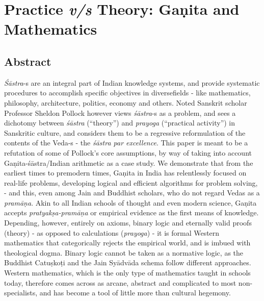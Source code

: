 \chapter[Practice {\sl  v/s} Theory: Gaṇita and Mathematics]{Practice {\sl\bfseries v/s} Theory: Gaṇita and Mathematics}\label{chapter2\thechapter:begin}\label{chapter2}


\section*{Abstract}

{\sl Śāstra}-s are an integral part of Indian knowledge systems, and provide systematic procedures to accomplish specific objectives in diverse\break fields - like mathematics, philosophy, architecture, politics, economy and others. Noted Sanskrit scholar Professor Sheldon Pollock however views {\sl śāstra}-s as a problem, and sees a dichotomy between {\sl śāstra} (``theory'') and {\sl prayoga} (``practical activity'') in Sanskritic culture, and considers them to be a regressive reformulation of the contents of the Veda-s - the {\sl śāstra par excellence}. This paper is meant to be a refutation of some of Pollock's core assumptions, by way of taking into account Gaṇita-śāstra/Indian arithmetic as a case study. We demonstrate that from the earliest times to premodern times, Gaṇita in India has relentlessly focused on real-life problems, developing logical and efficient algorithms for problem solving, - and this, even among Jain and Buddhist scholars, who do not regard Vedas as a {\sl pramāṇa}. Akin to all Indian schools of thought and even modern science, Gaṇita accepts {\sl pratyakṣa-pramāṇa} or empirical evidence as the first means of knowledge. Depending, however, entirely on axioms, binary logic and eternally valid proofs (theory) - as opposed to calculations ({\sl prayoga}) -  it is formal Western mathematics that categorically rejects the empirical world, and is imbued with theological dogma. Binary logic cannot be taken as a normative logic, as the Buddhist Catuṣkoṭi and the Jain Syādvāda schema follow different approaches. Western mathematics, which is the only type of mathematics taught in schools today, therefore comes across as arcane, abstract and complicated to most non-specialists, and has become a tool of little more than cultural hegemony.\\[-20pt] 

